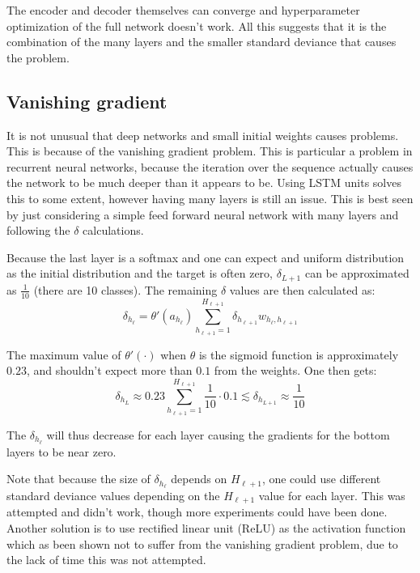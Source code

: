 The encoder and decoder themselves can converge and hyperparameter optimization of the full network doesn't work. All this suggests that it is the combination of the many layers and the smaller standard deviance that causes the problem.

\subsection{Vanishing gradient}
It is not unusual that deep networks and small initial weights causes problems. This is because of the vanishing gradient problem. This is particular a problem in recurrent neural networks, because the iteration over the sequence actually causes the network to be much deeper than it appears to be. Using LSTM units solves this to some extent, however having many layers is still an issue. This is best seen by just considering a simple feed forward neural network with many layers and following the $\delta$ calculations.

Because the last layer is a softmax and one can expect and uniform distribution as the initial distribution and the target is often zero, $\delta_{L+1}$ can be approximated as $\frac{1}{10}$ (there are 10 classes). The remaining $\delta$ values are then calculated as:
\begin{equation}
\delta_{h_\ell} = \theta'(a_{h_\ell}) \sum_{h_{\ell+1} = 1}^{H_{\ell+1}} \delta_{h_{\ell+1}} w_{h_\ell, h_{\ell+1}}
\end{equation}

The maximum value of $\theta'(\cdot)$ when $\theta$ is the sigmoid function is approximately $0.23$, and shouldn't expect more than $0.1$ from the weights. One then gets:
\begin{equation}
\delta_{h_L} \approx 0.23 \sum_{h_{\ell+1} = 1}^{H_{\ell+1}} \frac{1}{10} \cdot 0.1 \lesssim \delta_{h_{L+1}} \approx \frac{1}{10}
\end{equation}

The $\delta_{h_\ell}$ will thus decrease for each layer causing the gradients for the bottom layers to be near zero.

Note that because the size of $\delta_{h_\ell}$ depends on $H_{\ell+1}$, one could use different standard deviance values depending on the $H_{\ell+1}$ value for each layer. This was attempted and didn't work, though more experiments could have been done. Another solution is to use rectified linear unit (ReLU) as the activation function which as been shown not to suffer from the vanishing gradient problem, due to the lack of time this was not attempted.

